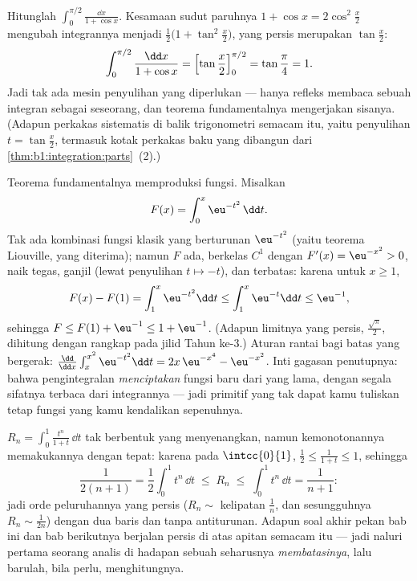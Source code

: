 \begin{example}\label{ex:b1:integration:halfangle}
Hitunglah $\displaystyle\int_0^{\pi/2} \frac{\dd x}{1 + \cos x}$.
Kesamaan sudut paruhnya $1 + \cos x = 2\cos^2\frac x2$ mengubah
integrannya menjadi $\frac{1}{2}\bigl(1 + \tan^2\frac
x2\bigr)$, yang persis merupakan  $\tan\frac x2$:
\[
\int_0^{\pi/2} \frac{\dd x}{1 + \cos x}
= \Bigl[\tan\frac x2\Bigr]_0^{\pi/2} = \tan\frac\pi4 = 1 .
\]
Jadi tak ada mesin penyulihan yang diperlukan --- hanya refleks
membaca sebuah integran sebagai  seseorang, dan teorema fundamentalnya
mengerjakan sisanya. (Adapun perkakas sistematis di balik 
trigonometri semacam itu, yaitu penyulihan $t = \tan\frac x2$,
termasuk kotak perkakas baku yang dibangun dari
\cref{thm:b1:integration:parts}~(2).)
\end{example}

\begin{example}\label{ex:b1:integration:definedby}
Teorema fundamentalnya memproduksi fungsi. Misalkan
\[
F(x) = \int_0^x \eu^{-t^2}\,\dd t .
\]
Tak ada kombinasi fungsi klasik yang berturunan
$\eu^{-t^2}$ (yaitu teorema Liouville, yang diterima); namun $F$ ada,
berkelas $C^1$ dengan $F'(x) = \eu^{-x^2} > 0$, naik tegas, ganjil
(lewat penyulihan $t \mapsto -t$), dan terbatas: karena untuk $x \geq 1$,
\[
F(x) - F(1) = \int_1^x \eu^{-t^2}\dd t
\leq \int_1^x \eu^{-t}\dd t \leq \eu^{-1} ,
\]
sehingga $F \leq F(1) + \eu^{-1} \leq 1 + \eu^{-1}$. (Adapun limitnya yang persis,
$\frac{\sqrt\pi}{2}$, dihitung dengan  rangkap pada jilid
Tahun ke-3.) Aturan rantai bagi batas yang bergerak: $\frac{\dd}{\dd
x}\int_x^{x^2} \eu^{-t^2}\dd t = 2x\,\eu^{-x^4} - \eu^{-x^2}$.
Inti gagasan penutupnya: bahwa pengintegralan \emph{menciptakan} fungsi baru
dari yang lama, dengan segala sifatnya terbaca dari
integrannya --- jadi primitif yang tak dapat kamu tuliskan tetap
fungsi yang kamu kendalikan sepenuhnya.
\end{example}

\begin{example}\label{ex:b1:integration:estimate}
 $R_n = \int_0^1 \frac{t^n}{1 + t}\,\dd t$ tak berbentuk
 yang menyenangkan, namun kemonotonannya memakukannya dengan tepat: karena pada
$\intcc{0}{1}$, $\frac12 \leq \frac{1}{1+t} \leq 1$, sehingga
\[
\frac{1}{2(n+1)} = \frac12\int_0^1 t^n\,\dd t
\;\leq\; R_n \;\leq\; \int_0^1 t^n \,\dd t = \frac{1}{n+1} :
\]
jadi orde peluruhannya yang persis ($R_n \sim$ kelipatan $\frac1n$,
dan sesungguhnya $R_n \sim \frac{1}{2n}$) dengan dua baris dan tanpa
antiturunan. Adapun soal akhir pekan bab ini dan bab
berikutnya berjalan persis di atas apitan semacam itu --- jadi naluri pertama
seorang analis di hadapan sebuah  seharusnya \emph{membatasinya}, lalu
barulah, bila perlu, menghitungnya.
\end{example}

